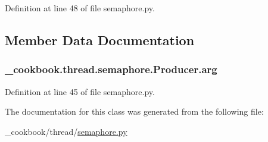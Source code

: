 Definition at line 48 of file semaphore.\-py.



\subsection{Member Data Documentation}
\hypertarget{class__cookbook_1_1thread_1_1semaphore_1_1Producer_ad9bb19976d4019473b25933e8589fb95}{
\subsubsection[{arg}]{\setlength{\rightskip}{0pt plus 5cm}\-\_\-cookbook.\-thread.\-semaphore.\-Producer.\-arg}}\label{class__cookbook_1_1thread_1_1semaphore_1_1Producer_ad9bb19976d4019473b25933e8589fb95}


Definition at line 45 of file semaphore.\-py.



The documentation for this class was generated from the following file\-:\begin{DoxyCompactItemize}
\item 
\-\_\-cookbook/thread/\hyperlink{semaphore_8py}{semaphore.\-py}\end{DoxyCompactItemize}

